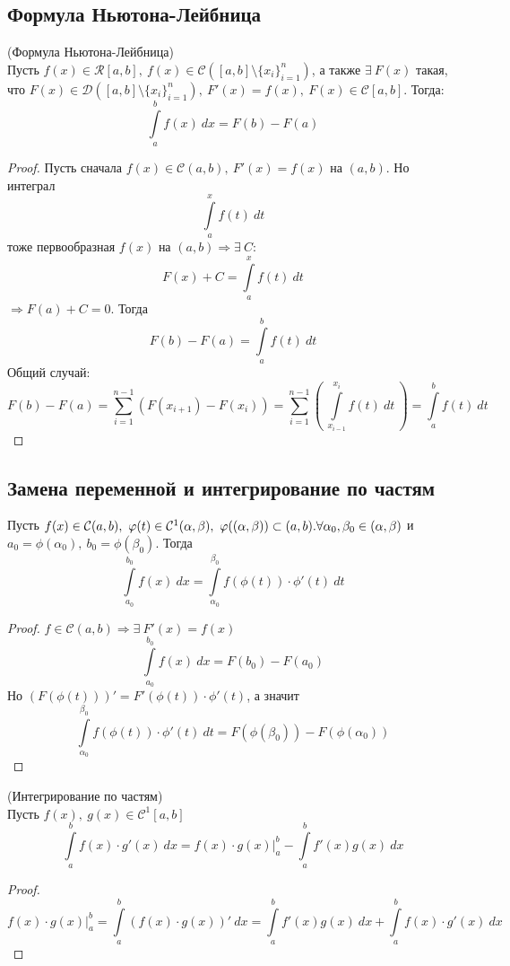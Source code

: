 \subsection{Формула Ньютона-Лейбница}
\begin{theorem} (Формула Ньютона-Лейбница)\\
    Пусть $f(x)\in \mathcal{R}[a,b],\ f(x)\in \mathcal{C}([a,b]\setminus \{x_i\}_{i=1}^{n})$, а также $\exists\ F(x)$ такая, что
    $F(x)\in \mathcal{D}([a,b]\setminus \{x_i\}_{i=1}^{n}),\ F'(x)=f(x),\ F(x)\in \mathcal{C}[a,b]$. Тогда: 
    \[\int\limits_{a}^{b}f(x)\ dx=F(b)-F(a)\]
\end{theorem} 
\begin{proof}
    Пусть сначала $f(x)\in \mathcal{C}(a,b),\ F'(x)=f(x)$ на $(a,b)$. Но интеграл
    \[\int\limits_{a}^{x}f(t)\ dt\]
    тоже первообразная $f(x)$ на $(a,b) \Rightarrow \exists\ C:$
    \[F(x)+C=\int\limits_{a}^{x}f(t)\ dt\]
    $\Rightarrow F(a)+C=0$. Тогда 
    \[F(b)-F(a)=\int\limits_{a}^{b} f(t)\ dt\]
    Общий случай:
        \[F(b)-F(a)=\sum\limits_{i=1}^{n-1}(F(x_{i+1})-F(x_{i}))=\sum\limits_{i=1}^{n-1}\left(\ \int\limits_{x_{i-1}}^{x_i} f(t)\ dt\ \right)=\int\limits_{a}^{b} f(t)\ dt\]
\end{proof} 
\subsection{Замена переменной и интегрирование по частям}
\begin{theorem}
    Пусть $f(x)\in \mathcal{C}(a,b),\ \phi(t)\in \mathcal{C}^1(\alpha, \beta),\ \phi((\alpha, \beta))\subset (a,b).\\
    \forall \alpha_0, \beta_0\in (\alpha, \beta)$ и $a_0=\phi(\alpha_0),\ b_0=\phi(\beta_0)$. Тогда
    \[\int\limits_{a_0}^{b_0}f(x)\ dx=\int\limits_{\alpha_0}^{\beta_0}f(\phi(t))\cdot \phi'(t)\ dt\]
\end{theorem} 
\begin{proof}
    $f\in \mathcal{C}(a,b) \Rightarrow \exists\ F'(x)=f(x)$
    \[\int\limits_{a_0}^{b_0}f(x)\ dx= F(b_0)-F(a_0)\]
    Но $(F(\phi(t)))'=F'(\phi(t))\cdot \phi'(t)$, а значит
    \[\int\limits_{\alpha_0}^{\beta_0}f(\phi(t))\cdot\phi'(t)\ dt=F(\phi(\beta_0))-F(\phi(\alpha_0))\]
\end{proof} 
\begin{theorem} (Интегрирование по частям)\\
    Пусть $f(x),\ g(x)\in \mathcal{C}^1[a,b]$
    \[\int\limits_{a}^{b}f(x)\cdot g'(x)\ dx=f(x)\cdot g(x)|_a^b-\int\limits_{a}^{b}f'(x)g(x)\ dx\]
\end{theorem} 
\begin{proof}
    \[f(x)\cdot g(x)|_a^b=\int\limits_{a}^{b}(f(x)\cdot g(x))'\ dx=\int\limits_{a}^{b}f'(x)g(x)\ dx+\int\limits_{a}^{b}f(x)\cdot g'(x)\ dx\]
\end{proof} 
\newpage
